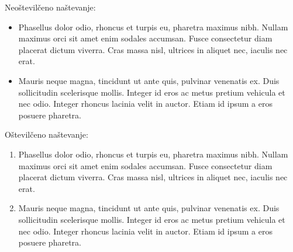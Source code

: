 \documentclass[a4paper]{article}
\begin{document}
Neoštevilčeno naštevanje:
%
\begin{itemize}

\item Phasellus dolor odio, rhoncus et turpis eu, pharetra maximus nibh. Nullam maximus
  orci sit amet enim sodales accumsan. Fusce consectetur diam placerat dictum viverra.
  Cras massa nisl, ultrices in aliquet nec, iaculis nec erat.

\item Mauris neque magna, tincidunt ut ante quis, pulvinar venenatis ex. Duis sollicitudin
  scelerisque mollis. Integer id eros ac metus pretium vehicula et nec odio. Integer
  rhoncus lacinia velit in auctor. Etiam id ipsum a eros posuere pharetra.
\end{itemize}

Oštevilčeno naštevanje:
%
\begin{enumerate}

\item Phasellus dolor odio, rhoncus et turpis eu, pharetra maximus nibh. Nullam maximus
  orci sit amet enim sodales accumsan. Fusce consectetur diam placerat dictum viverra.
  Cras massa nisl, ultrices in aliquet nec, iaculis nec erat.

\item Mauris neque magna, tincidunt ut ante quis, pulvinar venenatis ex. Duis sollicitudin
  scelerisque mollis. Integer id eros ac metus pretium vehicula et nec odio. Integer
  rhoncus lacinia velit in auctor. Etiam id ipsum a eros posuere pharetra.
\end{enumerate}
\end{document}
